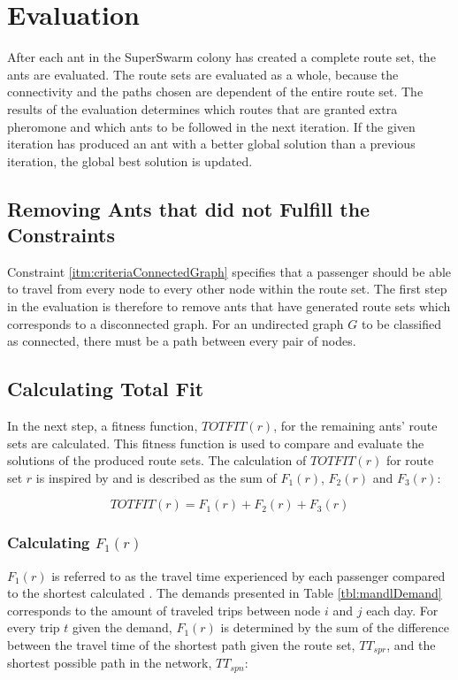 \section{Evaluation}
\label{sec:algoEvaluation}
After each ant in the SuperSwarm colony has created a complete route set, the ants are evaluated. The route sets are evaluated as a whole, because the connectivity and the paths chosen are dependent of the entire route set. The results of the evaluation determines which routes that are granted extra pheromone and which ants to be followed in the next iteration. If the given iteration has produced an ant with a better global solution than a previous iteration, the global best solution is updated.

\subsection{Removing Ants that did not Fulfill the Constraints}
\label{sec:algoRemoval}
Constraint \vref{itm:criteriaConnectedGraph} specifies that a passenger should be able to travel from every node to every other node within the route set. The first step in the evaluation is therefore to remove ants that have generated route sets which corresponds to a disconnected graph. For an undirected graph $G$ to be classified as connected, there must be a path between every pair of nodes. 

\subsection{Calculating Total Fit}
\label{sec:totfit}
In the next step, a fitness function, $TOTFIT(r)$, for the remaining ants' route sets are calculated. This fitness function is used to compare and evaluate the solutions of the produced route sets. The calculation of $TOTFIT(r)$ for route set $r$ is inspired by \citet{kechagiopoulos14} and is described as the sum of $F_{1}(r)$, $F_{2}(r)$ and $F_{3}(r)$: 

$$ TOTFIT(r) = F_{1}(r) + F_{2}(r) + F_{3}(r)$$

\subsubsection{Calculating $F_{1}(r)$}
\label{sec:f1}
$F_{1}(r)$ is referred to as the travel time experienced by each passenger compared to the shortest calculated . The demands presented in Table \vref{tbl:mandlDemand} corresponds to the amount of traveled trips between node $i$ and $j$ each day. For every trip $t$ given the demand, $F_{1}(r)$ is determined by the sum of the difference between the travel time of the shortest path given the route set, $TT_{spr}$, and the shortest possible path in the network, $TT_{spn}$:

